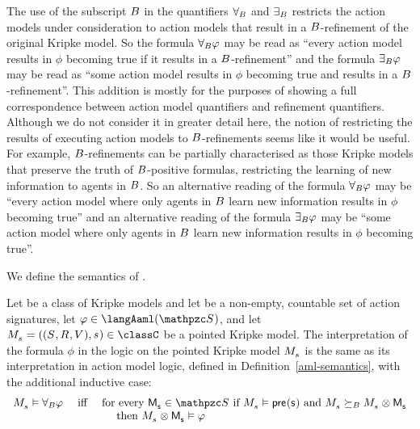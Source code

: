 The use of the subscript $B$ in the quantifiers ${\forall_{B}}$ and ${\exists_{B}}$ restricts the action models under consideration to action models that result in a $B$-refinement of the original Kripke model.
So the formula ${\forall_{B}} \varphi$ may be read as ``every action model results in $\phi$ becoming true if it results in a $B$-refinement'' and the formula ${\exists_{B}} \varphi$ may be read as ``some action model results in $\phi$ becoming true and results in a $B$-refinement''.
This addition is mostly for the purposes of showing a full correspondence between action model quantifiers and refinement quantifiers.
Although we do not consider it in greater detail here, the notion of restricting the results of executing action models to $B$-refinements seems like it would be useful.
For example, $B$-refinements can be partially characterised as those Kripke models that preserve the truth of $B$-positive formulas, restricting the learning of new information to agents in $B$.
So an alternative reading of the formula ${\forall_{B}} \varphi$ may be ``every action model where only agents in $B$ learn new information results in $\phi$ becoming true'' and an alternative reading of the formula ${\exists_{B}} \varphi$ may be ``some action model where only agents in $B$ learn new information results in $\phi$ becoming true''.

We define the semantics of \logicAaml{}.

\begin{definition}
Let \classC{} be a class of Kripke models and let \aSignatureFamily{} be a non-empty, countable set of action signatures, let $\phi \in \langAaml(\aSignatureFamily)$, and let $\kPModelAndTuple{\kStateS} \in \classC$ be a pointed Kripke model.
The interpretation of the formula $\phi$ in the logic \logicAamlC{} on the pointed Kripke model $\kPModel{\kStateS}$ is the same as its interpretation in action model logic, defined in Definition~\ref{aml-semantics}, with the additional inductive case:
$$
\begin{array}{lcl}
    \kPModel{\kStateS} \entails \allactsBs \phi & \text{ iff } & \text{for every } \aPModel{\aStateS} \in \aSignatureFamily \text{ if } \kPModel{\kStateS} \entails \aPrecondition(\aStateS) \text{ and } \kPModel{\kStateS} \simulatesBs \kPModel{\kStateS} \exec \aPModel{\aStateS}\\&&\quad \text{ then } \kPModel{\kStateS} \exec \aPModel{\aStateS} \entails \phi
\end{array}
$$
\end{definition}

